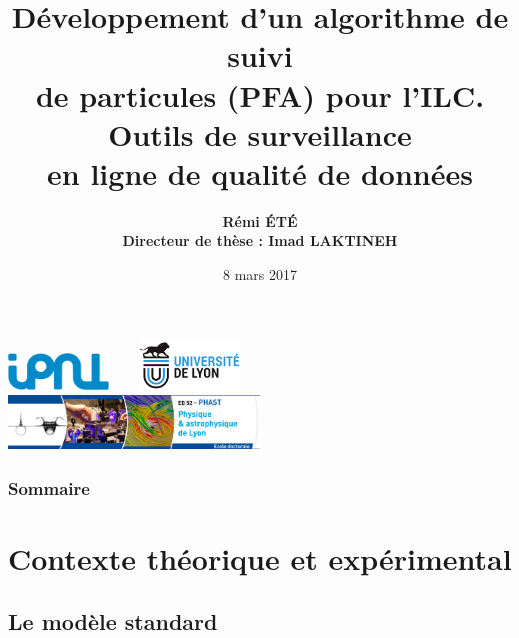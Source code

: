 \documentclass[8pt]{beamer}
\title[Séminaire 2ieme année]{Développement d'un algorithme de suivi \\ de particules (PFA) pour l'ILC. Outils de surveillance \\ en ligne de qualité de données}
\institute{\normalsize Institut de Physique Nucléaire de Lyon}
\author[R. Eté]{{\large \bf Rémi \'ET\'E} \\ {\bf Directeur de thèse : Imad LAKTINEH}}
\date{8 mars 2017}
\begin{document}
  \begin{frame}
    \titlepage
    \begin{center}
      \includegraphics[width=0.2\textwidth]{logo/logo_ipnl.jpg} ~~~
      \includegraphics[width=0.2\textwidth]{logo/logo-univ-lyon.png} ~~~
      \includegraphics[width=0.5\textwidth]{logo/logo-edphast.jpg}
    \end{center}
  \end{frame}


  \begin{frame}
  \frametitle{Sommaire}
    \tableofcontents
  \end{frame}



  \section{Contexte théorique et expérimental}

  \begin{frame}
  \frametitle{\secname}
    \tableofcontents[currentsection]
  \end{frame}

  \subsection{Le modèle standard}
\end{document}
